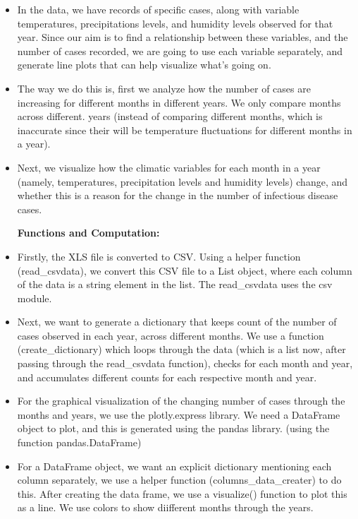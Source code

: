 \documentclass[fontsize=11pt]{article}
\begin{document}
    \begin{itemize}
        \item \large In the data, we have records of specific cases, along with variable temperatures, precipitations levels, and humidity levels observed for that year. Since our aim is to find a relationship between these variables, and the number of cases recorded, we are going to use each variable separately, and generate line plots that can help visualize what's going on.

        \item The way we do this is, first we analyze how the number of cases are increasing for different months in different years. We only compare months across different. years (instead of comparing different months, which is inaccurate since their will be temperature fluctuations for different months in a year).

        \item Next, we visualize how the climatic variables for each month in a year (namely, temperatures, precipitation levels and humidity levels) change, and whether this is a reason for the change in the number of infectious disease cases.

        \textbf{Functions and Computation:}

        \item Firstly, the XLS file is converted to CSV. Using a helper function (read\_csvdata), we convert this CSV file to a List object, where each column of the data is a string element in the list. The read\_csvdata uses the csv module.

        \item Next, we want to generate a dictionary that keeps count of the number of cases observed in each year, across different months. We use a function (create\_dictionary) which loops through the data (which is a list now, after passing through the read\_csvdata function), checks for each month and year, and accumulates different counts for each respective month and year.

        \item For the graphical visualization of the changing number of cases through the months and years, we use the plotly.express library. We need a DataFrame object to plot, and this is generated using the pandas library. (using the function pandas.DataFrame)

        \item For a DataFrame object, we want an explicit dictionary mentioning each column separately, we use a helper function (columns\_data\_creater) to do this. After creating the data frame, we use a visualize() function to plot this as a line. We use colors to show diifferent months through the years.


\end{itemize}
\end{document}
